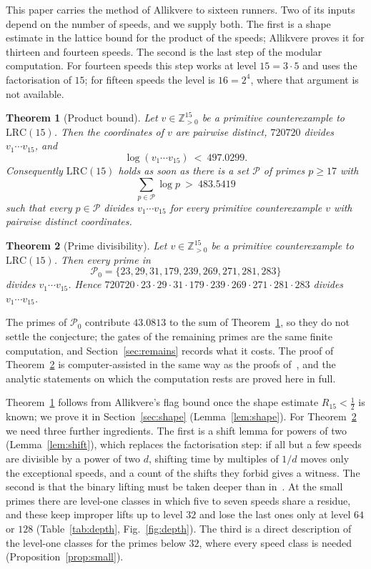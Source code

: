 \documentclass[aps,prd,twocolumn,superscriptaddress,nofootinbib,longbibliography,floatfix,showkeys,amsmath,amssymb,10pt]{revtex4-2}
\newtheorem{theorem}{Theorem}
\theoremstyle{definition}
\theoremstyle{remark}
\newcommand{\Z}{\mathbb{Z}}
\newcommand{\LRC}{\mathrm{LRC}}
\begin{document}
This paper carries the method of Allikvere to sixteen runners. Two of its
inputs depend on the number of speeds, and we supply both. The first is a
shape estimate in the lattice bound for the product of the speeds; Allikvere
proves it for thirteen and fourteen speeds. The second is the last step of
the modular computation. For fourteen speeds this step works at level
$15=3\cdot5$ and uses the factorisation of $15$; for fifteen speeds the
level is $16=2^4$, where that argument is not available.

\begin{theorem}[Product bound]\label{thm:bound}
Let $v\in\Z_{>0}^{15}$ be a primitive counterexample to $\LRC(15)$. Then the
coordinates of $v$ are pairwise distinct, $720720$ divides
$v_1\cdots v_{15}$, and
\[
 \log(v_1\cdots v_{15})\ <\ 497.0299 .
\]
Consequently $\LRC(15)$ holds as soon as there is a set $\mathcal P$ of
primes $p\ge17$ with
\[
 \sum_{p\in\mathcal P}\log p\ >\ 483.5419
\]
such that every $p\in\mathcal P$ divides $v_1\cdots v_{15}$ for every
primitive counterexample $v$ with pairwise distinct coordinates.
\end{theorem}

\begin{theorem}[Prime divisibility]\label{thm:primes}
Let $v\in\Z_{>0}^{15}$ be a primitive counterexample to $\LRC(15)$. Then every
prime in
\[
 \mathcal P_0=\{23,29,31,179,239,269,271,281,283\}
\]
divides $v_1\cdots v_{15}$. Hence
$720720\cdot23\cdot29\cdot31\cdot179\cdot239\cdot269\cdot271\cdot281\cdot283$ divides $v_1\cdots v_{15}$.
\end{theorem}

The primes of $\mathcal P_0$ contribute $43.0813$ to the sum of
Theorem~\ref{thm:bound}, so they do not settle the conjecture; the gates of
the remaining primes are the same finite computation, and
Section~\ref{sec:remains} records what it costs. The proof of
Theorem~\ref{thm:primes} is computer-assisted in the same way as the proofs
of~\cite{ST26,All26}, and the analytic statements on which the computation
rests are proved here in full.

Theorem~\ref{thm:bound} follows from Allikvere's flag bound once the shape
estimate $R_{15}<\frac12$ is known; we prove it in
Section~\ref{sec:shape} (Lemma~\ref{lem:shape}). For
Theorem~\ref{thm:primes} we need three further ingredients. The first is a
shift lemma for powers of two (Lemma~\ref{lem:shift}), which replaces the
factorisation step: if all but a few speeds are divisible by a power of two
$d$, shifting time by multiples of $1/d$ moves only the exceptional speeds,
and a count of the shifts they forbid gives a witness. The second is that
the binary lifting must be taken deeper than in~\cite{All26}. At the small
primes there are level-one classes in which five to seven speeds share a
residue, and these keep improper lifts up to level $32$ and lose the last
ones only at level $64$ or $128$ (Table~\ref{tab:depth},
Fig.~\ref{fig:depth}). The third is a direct description of the level-one
classes for the primes below $32$, where every speed class is needed
(Proposition~\ref{prop:small}).
\end{document}
